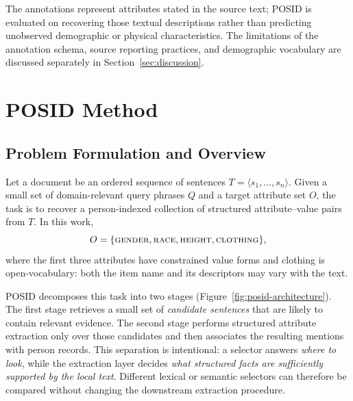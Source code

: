 \documentclass[sigconf,nonacm]{acmart}
\newcommand{\posid}{\textsc{POSID}}
\begin{document}
The annotations represent attributes stated in the source text; \posid{} is
evaluated on recovering those textual descriptions rather than predicting
unobserved demographic or physical characteristics. The limitations of the
annotation schema, source reporting practices, and demographic vocabulary are
discussed separately in Section~\ref{sec:discussion}.


\section{\posid{} Method}
\label{sec:method}

\subsection{Problem Formulation and Overview}
\label{subsec:method-overview}

Let a document be an ordered sequence of sentences
$T=\langle s_1,\ldots,s_n\rangle$.  Given a small set of domain-relevant query
phrases $Q$ and a target attribute set $O$, the task is to recover a
person-indexed collection of structured attribute--value pairs from $T$.  In
this work,
\[
O=\{\textsc{gender},\textsc{race},\textsc{height},\textsc{clothing}\},
\]
where the first three attributes have constrained value forms and clothing is
open-vocabulary: both the item name and its descriptors may vary with the
text.

\posid{} decomposes this task into two stages (Figure~\ref{fig:posid-architecture}).
The first stage retrieves a small set of \emph{candidate sentences} that are
likely to contain relevant evidence.  The second stage performs structured
attribute extraction only over those candidates and then associates the
resulting mentions with person records.  This separation is intentional: a
selector answers \emph{where to look}, while the extraction layer decides
\emph{what structured facts are sufficiently supported by the local text}.
Different lexical or semantic selectors can therefore be compared without
changing the downstream extraction procedure.
\end{document}
